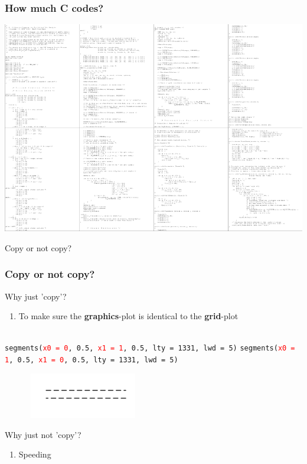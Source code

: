 \documentclass{beamer}
\begin{document}
\begin{frame}[fragile]
\frametitle{How much \textbf{C} codes?}
\begin{center}
\includegraphics{plot/code.png}
\end{center}
\end{frame}



\begin{frame}[fragile]
\begin{center}
\Huge Copy or not copy?
\end{center}
\end{frame}


\begin{frame}[fragile]
\frametitle{Copy or not copy?}
Why just 'copy'?

\begin{enumerate}
  \item To make sure the \textbf{graphics}-plot is identical to the \textbf{grid}-plot\\~\\
\end{enumerate}

\texttt{segments(\textcolor{red}{x0 = 0}, 0.5, \textcolor{red}{x1 = 1}, 0.5, lty = 1331, lwd = 5)}
\texttt{segments(\textcolor{red}{x0 = 1}, 0.5, \textcolor{red}{x1 = 0}, 0.5, lty = 1331, lwd = 5)}
\begin{center}
  \includegraphics[height = 2cm, width = 7cm]{plot/Rcopy.pdf}
\end{center}


Why just not 'copy'?
\begin{enumerate}
  \item Speeding
\end{enumerate}


\end{frame}
\end{document}
